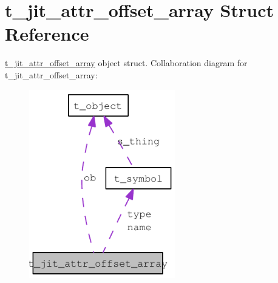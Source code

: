 \hypertarget{structt__jit__attr__offset__array}{
\section{t\_\-jit\_\-attr\_\-offset\_\-array Struct Reference}
\label{structt__jit__attr__offset__array}
}


\hyperlink{structt__jit__attr__offset__array}{t\_\-jit\_\-attr\_\-offset\_\-array} object struct.  
Collaboration diagram for t\_\-jit\_\-attr\_\-offset\_\-array:\nopagebreak
\begin{figure}[H]
\begin{center}
\leavevmode
\includegraphics[width=180pt]{structt__jit__attr__offset__array__coll__graph}
\end{center}
\end{figure}
